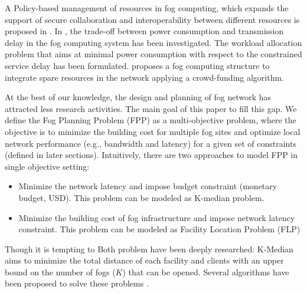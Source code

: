 \documentclass[10pt,journal,compsoc]{IEEEtran}
\begin{document}
A Policy-based management of resources in fog computing, which expands the support of secure collaboration and interoperability between different resources is proposed in \cite{secme}. In \cite{fcworkload}, the trade-off between power consumption and transmission delay in the fog computing system has been investigated. The workload allocation problem that aims at minimal power consumption with respect to the constrained service delay has been formulated. \cite{SUN2017687} proposes a fog computing structure to integrate spare resources in the network applying a crowd-funding algorithm.

At the best of our knowledge, the design and planning of fog network has attracted less research activities. The main goal of this paper to fill this gap. We define the Fog Planning Problem (FPP) as a multi-objective problem, where the objective is to minimize the building cost for multiple fog sites and optimize local network performance (e.g., bandwidth and latency) for a given set of constraints (defined in later sections).
%
%
\iffalse
Intuitively, there are two approaches to model FPP in single objective setting:
\begin{itemize}
\item Minimize the network latency and impose budget constraint (monetary budget, USD). This problem can be modeled as K-median problem.
\item Minimize the building cost of fog infrastructure and impose network latency constraint. This problem can be modeled as Facility Location Problem (FLP)
\end{itemize}
Though it is tempting to 
Both problem have been deeply researched: K-Median aims to minimize the total distance of each facility and clients with an upper bound on the number of fogs ($K$) that can be opened. Several algorithms have been proposed to solve these problems \cite{Bartal:1996:PAM:874062.875536, Charikar:1999:CAA:301250.301257, Arya:2001:LSH:380752.380755}.
\end{document}
